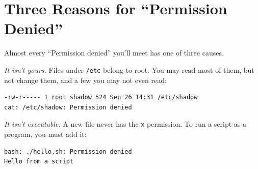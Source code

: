 \section{Three Reasons for ``Permission Denied''}\label{03-files-folders-and-who-may-touch-them:three-reasons-for-permission-denied}

Almost every ``Permission denied'' you'll meet has one of three causes.


\emph{It isn't yours.} Files under \texttt{/etc} belong to root. You may read most of them, but not change them, and a few you may not even read:

\begin{codeblock}

\begin{Shaded}
\begin{Highlighting}[]
 
\end{Highlighting}
\end{Shaded}

\end{codeblock}

\begin{codeblock}
\begin{Verbatim}[formatcom=\outputstyle]
-rw-r----- 1 root shadow 524 Sep 26 14:31 /etc/shadow
cat: /etc/shadow: Permission denied
\end{Verbatim}
\end{codeblock}


\emph{It isn't executable.} A new file never has the \texttt{x} permission. To run a script as a program, you must add it:

\begin{codeblock}

\begin{Shaded}
\begin{Highlighting}[]
\end{Highlighting}
\end{Shaded}

\end{codeblock}

\begin{codeblock}
\begin{Verbatim}[formatcom=\outputstyle]
bash: ./hello.sh: Permission denied
Hello from a script
\end{Verbatim}
\end{codeblock}

